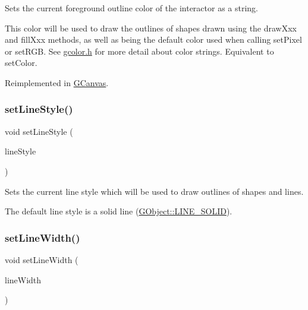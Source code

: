 Sets the current foreground outline color of the interactor as a string. 

This color will be used to draw the outlines of shapes drawn using the draw\+Xxx and fill\+Xxx methods, as well as being the default color used when calling set\+Pixel or set\+R\+GB. See \mbox{\hyperlink{gcolor_8h_source}{gcolor.\+h}} for more detail about color strings. Equivalent to set\+Color. 

Reimplemented in \mbox{\hyperlink{classGCanvas_a088e04dfc56273df4cedab2b11b970f5}{G\+Canvas}}.

\mbox{\label{classGDrawingSurface_a6bfe14a77101db0fb97b5a7e07a5526b}} 
\subsubsection{\texorpdfstring{set\+Line\+Style()}{setLineStyle()}}
{\footnotesize\ttfamily void set\+Line\+Style (\begin{DoxyParamCaption}\item[{\mbox{\hyperlink{classGObject_a86e0f5648542856159bb40775c854aa7}{G\+Object\+::\+Line\+Style}}}]{line\+Style }\end{DoxyParamCaption})\hspace{0.3cm}{\ttfamily [virtual]}}



Sets the current line style which will be used to draw outlines of shapes and lines. 

The default line style is a solid line (\mbox{\hyperlink{classGObject_a86e0f5648542856159bb40775c854aa7a700c78bc2cd76acaab26651bf7b4941f}{G\+Object\+::\+L\+I\+N\+E\+\_\+\+S\+O\+L\+ID}}). \mbox{\label{classGDrawingSurface_afd6a47c6ea6a1f85ca05a65ba3ff3477}} 
\subsubsection{\texorpdfstring{set\+Line\+Width()}{setLineWidth()}}
{\footnotesize\ttfamily void set\+Line\+Width (\begin{DoxyParamCaption}\item[{double}]{line\+Width }\end{DoxyParamCaption})\hspace{0.3cm}{\ttfamily [virtual]}}



